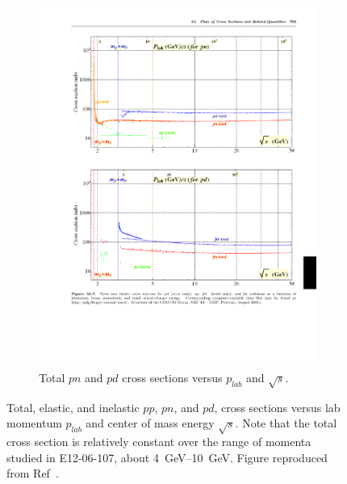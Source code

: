 \begin{figure}[!h]
\begin{subfigure}[b]{1.0\textwidth}
        \includegraphics[width=1.0\textwidth]{chap2/pdg_pn_cross_section.pdf}
        \caption[Total $pn$ and $pd$ cross sections versus
                 $p_{lab}$ and $\sqrt{s}$.]{
                 Total $pn$ and $pd$ cross sections versus
                 $p_{lab}$ and $\sqrt{s}$.
                }
        \label{fig:pdg_pn_cross_section}
    \end{subfigure}
    \caption[Total, elastic, and inelastic $pp$, $pn$, and $pd$, cross sections
             versus lab momentum $p_{lab}$ and center of mass energy $\sqrt{s}$.]{
             Total, elastic, and inelastic $pp$, $pn$, and $pd$, cross sections
             versus lab momentum $p_{lab}$ and center of mass energy $\sqrt{s}$.
             Note that the total cross section is relatively constant over
             the range of momenta studied in E12-06-107, about
             \SIrange{4}{10}{\giga\electronvolt}.
             Figure reproduced from Ref~\cite{pdg_2020}.
             }
    \label{fig:pdg_nucleon_nucleon_cross_section}
\end{figure}


